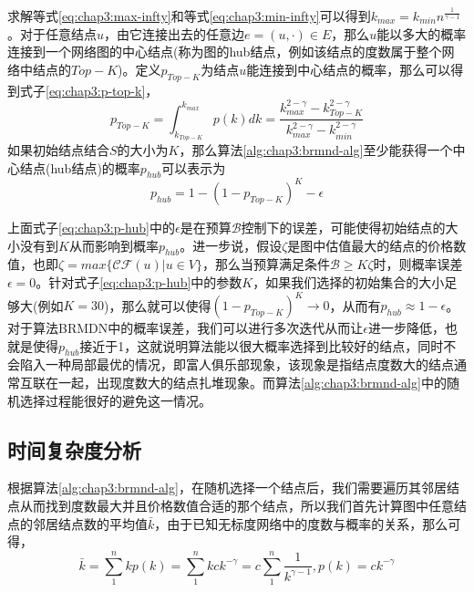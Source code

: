 求解等式\ref{eq:chap3:max-infty}和等式\ref{eq:chap3:min-infty}可以得到$k_{max} = k_{min}n^{\frac{1}{\gamma-1}}$。对于任意结点$u$，由它连接出去的任意边$e=(u, \cdot) \in E$，那么$u$能以多大的概率连接到一个网络图的中心结点(称为图的hub结点，例如该结点的度数属于整个网络中结点的$Top-K$)。定义$p_{Top-K}$为结点$u$能连接到中心结点的概率，那么可以得到式子\ref{eq:chap3:p-top-k}，
\begin{equation}
\label{eq:chap3:p-top-k}
p_{Top-K} = \int_{k_{Top-K}}^{k_{max}}p(k)dk = \frac{k_{max}^{2-\gamma} - k_{Top-K}^{2-\gamma}}{k_{max}^{2-\gamma} - k_{min}^{2-\gamma}}
\end{equation}
如果初始结点结合$S$的大小为$K$，那么算法\ref{alg:chap3:brmnd-alg}至少能获得一个中心结点(hub结点)的概率$p_{hub}$可以表示为
\begin{equation}
\label{eq:chap3:p-hub}
p_{hub} = 1 - (1-p_{Top-K})^{K} - \epsilon
\end{equation}


上面式子\ref{eq:chap3:p-hub}中的$\epsilon$是在预算$\mathcal{B}$控制下的误差，可能使得初始结点的大小没有到$K$从而影响到概率$p_{hub}$。进一步说，假设$\zeta$是图中估值最大的结点的价格数值，也即$\zeta = max \{\mathcal{CF}(u) | u \in V\}$，那么当预算满足条件$\mathcal{B} \geq K\zeta$时，则概率误差$\epsilon = 0$。针对式子\ref{eq:chap3:p-hub}中的参数$K$，如果我们选择的初始集合的大小足够大(例如$K=30$)，那么就可以使得$(1-p_{Top-K})^{K} \rightarrow 0$，从而有$p_{hub} \approx 1 - \epsilon$。对于算法BRMDN中的概率误差，我们可以进行多次迭代从而让$\epsilon$进一步降低，也就是使得$p_{hub}$接近于1，这就说明算法能以很大概率选择到比较好的结点，同时不会陷入一种局部最优的情况，即富人俱乐部现象\cite{zhou2004rich}，该现象是指结点度数大的结点通常互联在一起，出现度数大的结点扎堆现象。而算法\ref{alg:chap3:brmnd-alg}中的随机选择过程能很好的避免这一情况。


\subsection{时间复杂度分析}
根据算法\ref{alg:chap3:brmnd-alg}，在随机选择一个结点后，我们需要遍历其邻居结点从而找到度数最大并且价格数值合适的那个结点，所以我们首先计算图中任意结点的邻居结点数的平均值$\bar{k}$，由于已知无标度网络中的度数与概率的关系，那么可得，
\begin{equation}
\label{eq:chap3:avg-degree-k}
\bar{k} = \sum_{1}^{n} kp(k) = \sum_{1}^{n}kck^{-\gamma} = c\sum_{1}^{n}\frac{1}{k^{\gamma-1}},p(k)=ck^{-\gamma}
\end{equation}


